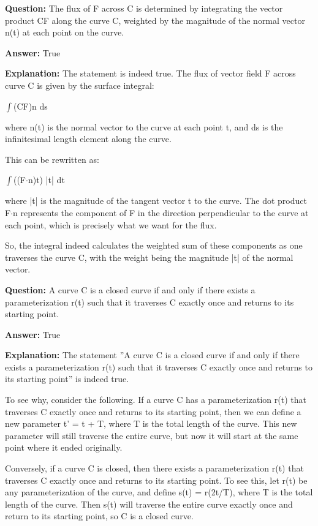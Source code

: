 \documentclass{article}
\begin{document}
            
                \textbf {Question:} The flux of F across C is determined by integrating the vector product CF along the curve C, weighted by the magnitude of the normal vector n(t) at each point on the curve.
                
                \textbf{Answer:} True

                \textbf{Explanation:} The statement is indeed true. The flux of vector field F across curve C is given by the surface integral:

\ensuremath{\int}(CF){\textperiodcentered}n ds

where n(t) is the normal vector to the curve at each point t, and ds is the infinitesimal length element along the curve.

This can be rewritten as:

\ensuremath{\int}((F\ensuremath{\cdot}n){\textperiodcentered}t) |t| dt

where |t| is the magnitude of the tangent vector t to the curve. The dot product F\ensuremath{\cdot}n represents the component of F in the direction perpendicular to the curve at each point, which is precisely what we want for the flux.

So, the integral indeed calculates the weighted sum of these components as one traverses the curve C, with the weight being the magnitude |t| of the normal vector.
                
                \vspace{0.5cm} 
        
            
                \textbf {Question:} A curve C is a closed curve if and only if there exists a parameterization r(t) such that it traverses C exactly once and returns to its starting point.
                
                \textbf{Answer:} True

                \textbf{Explanation:} The statement ''A curve C is a closed curve if and only if there exists a parameterization r(t) such that it traverses C exactly once and returns to its starting point'' is indeed true.

To see why, consider the following. If a curve C has a parameterization r(t) that traverses C exactly once and returns to its starting point, then we can define a new parameter t' = t + T, where T is the total length of the curve. This new parameter will still traverse the entire curve, but now it will start at the same point where it ended originally.

Conversely, if a curve C is closed, then there exists a parameterization r(t) that traverses C exactly once and returns to its starting point. To see this, let r(t) be any parameterization of the curve, and define s(t) = r(2t/T), where T is the total length of the curve. Then s(t) will traverse the entire curve exactly once and return to its starting point, so C is a closed curve.
\end{document}

